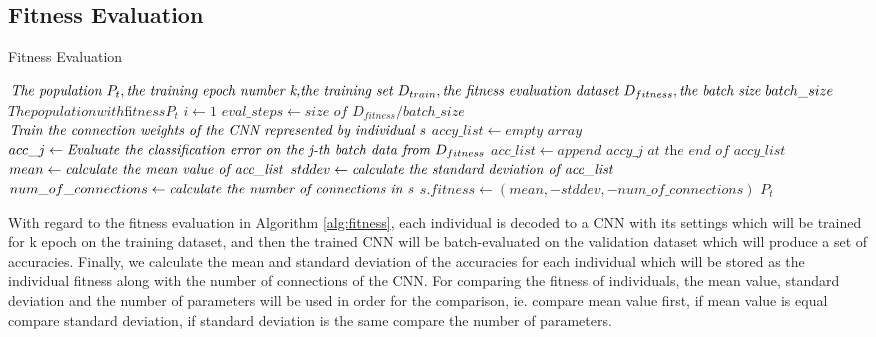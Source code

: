 \documentclass[conference]{IEEEtran}
\begin{document}
\subsection{Fitness Evaluation}
\begin{algorithm}
	\caption{Fitness Evaluation}
	\label{alg:fitness}
	\begin{algorithmic}
		\renewcommand{\algorithmicrequire}{\textbf{Input:}}
		\renewcommand{\algorithmicensure}{\textbf{Output:}}
		\REQUIRE $\textit{The population } P_{t}, \newline \textit{the training epoch number k,} \newline \textit{the training set } D_{train}, \newline \textit{the ﬁtness evaluation dataset } D_{fitness}, \newline \textit{the batch size } batch\_size$
		\ENSURE $The population with ﬁtness P_{t}$
			\STATE $i \leftarrow 1$
			\STATE $eval\_steps \leftarrow \textit{size of } D_{fitness} / batch\_size$
				\STATE $\textit{Train the connection weights of the CNN } \newline \textit{represented by individual s}$
					\STATE $accy\_list \leftarrow \textit{empty array}$
						\STATE $acc\_j \leftarrow \textit{Evaluate the classiﬁcation error on } \newline \textit{the j-th batch data from } D_{fitness}$
						\STATE $acc\_list \leftarrow \textit{append accy\_j at the end of accy\_list}$
					\ENDWHILE
					\STATE $mean \leftarrow \textit{calculate the mean value }\newline \textit{of  acc\_list}$
					\STATE $stddev \leftarrow \textit{calculate the standard deviation }\newline \textit{of acc\_list}$
					\STATE $num\_of\_connections \leftarrow \textit{calculate the number }\newline \textit{of connections in s}$
					\STATE $s.fitness \leftarrow (mean, -stddev, -num\_of\_connections)$
				\ENDIF
			\ENDWHILE
		\ENDFOR	
		\RETURN $P_{t}$	
	\end{algorithmic}
\end{algorithm}

With regard to the fitness evaluation in Algorithm \ref{alg:fitness}, each individual is decoded to a CNN with its settings which will be trained for k epoch on the training dataset, and then the trained CNN will be batch-evaluated on the validation dataset which will produce a set of accuracies. Finally, we calculate the mean and standard deviation of the accuracies for each individual which will be stored as the individual fitness along with the number of connections of the CNN. 
For comparing the fitness of individuals, the mean value, standard deviation and the number of parameters will be used in order for the comparison, ie. compare mean value first, if mean value is equal compare standard deviation, if standard deviation is the same compare the number of parameters.
\end{document}
